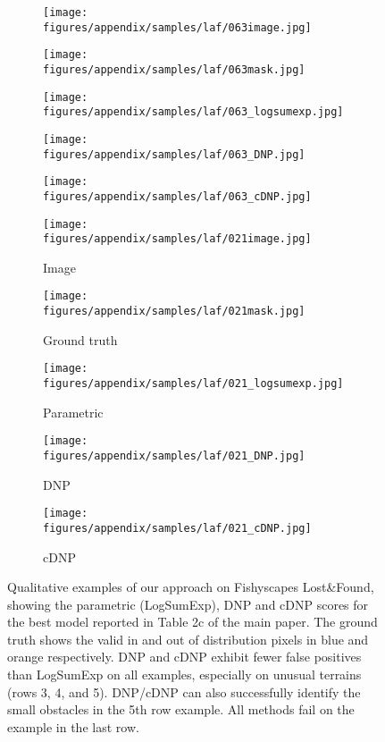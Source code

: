 \documentclass[10pt,twocolumn,letterpaper]{article}
\begin{document}
\begin{figure*}[h!]
    \begin{subfigure}[b]{0.175\textwidth}
        \centering
        \texttt{[image: figures/appendix/samples/laf/063image.jpg]}
    \end{subfigure}
    \begin{subfigure}[b]{0.175\textwidth}
        \centering
        \texttt{[image: figures/appendix/samples/laf/063mask.jpg]}
    \end{subfigure}
    \begin{subfigure}[b]{0.175\textwidth}
        \centering
        \texttt{[image: figures/appendix/samples/laf/063\_logsumexp.jpg]}
    \end{subfigure}
    \begin{subfigure}[b]{0.175\textwidth}
        \centering
        \texttt{[image: figures/appendix/samples/laf/063\_DNP.jpg]}
    \end{subfigure}
    \begin{subfigure}[b]{0.175\textwidth}
        \centering
        \texttt{[image: figures/appendix/samples/laf/063\_cDNP.jpg]}
    \end{subfigure}
    
    \begin{subfigure}[b]{0.175\textwidth}
        \centering
        \texttt{[image: figures/appendix/samples/laf/021image.jpg]}
        \caption*{Image}
    \end{subfigure}
    \begin{subfigure}[b]{0.175\textwidth}
        \centering
        \texttt{[image: figures/appendix/samples/laf/021mask.jpg]}
        \caption*{Ground truth}
    \end{subfigure}
    \begin{subfigure}[b]{0.175\textwidth}
        \centering
        \texttt{[image: figures/appendix/samples/laf/021\_logsumexp.jpg]}
        \caption*{Parametric}
    \end{subfigure}
    \begin{subfigure}[b]{0.175\textwidth}
        \centering
        \texttt{[image: figures/appendix/samples/laf/021\_DNP.jpg]}
        \caption*{DNP}
    \end{subfigure}
    \begin{subfigure}[b]{0.175\textwidth}
        \centering
        \texttt{[image: figures/appendix/samples/laf/021\_cDNP.jpg]}
        \caption*{cDNP}
    \end{subfigure}
    
    \caption{Qualitative examples of our approach on Fishyscapes Lost\&Found, showing the parametric (LogSumExp), DNP and cDNP scores for the best model reported in Table 2c of the main paper. The ground truth shows the valid in and out of distribution pixels in blue and orange respectively. DNP and cDNP exhibit fewer false positives than LogSumExp on all examples, especially on unusual terrains (rows 3, 4, and 5). DNP/cDNP can also successfully identify the small obstacles in the 5th row example. All methods fail on the example in the last row.}
    
    \label{fig:laf_quali}
\end{figure*} 
\end{document}
